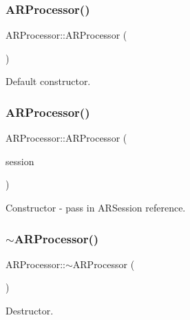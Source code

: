 \subsubsection{\texorpdfstring{A\+R\+Processor()}{ARProcessor()}\hspace{0.1cm}{\footnotesize\ttfamily [1/2]}}
{\footnotesize\ttfamily A\+R\+Processor\+::\+A\+R\+Processor (\begin{DoxyParamCaption}{ }\end{DoxyParamCaption})}



Default constructor. 

\mbox{\label{class_a_r_processor_a2dda14173a82870379c111d13a0562d6}} 
\subsubsection{\texorpdfstring{A\+R\+Processor()}{ARProcessor()}\hspace{0.1cm}{\footnotesize\ttfamily [2/2]}}
{\footnotesize\ttfamily A\+R\+Processor\+::\+A\+R\+Processor (\begin{DoxyParamCaption}\item[{A\+R\+Session $\ast$}]{session }\end{DoxyParamCaption})}



Constructor -\/ pass in A\+R\+Session reference. 

\mbox{\label{class_a_r_processor_a9bd83aa6f017e308d1e55e709621ae84}} 
\subsubsection{\texorpdfstring{$\sim$\+A\+R\+Processor()}{~ARProcessor()}}
{\footnotesize\ttfamily A\+R\+Processor\+::$\sim$\+A\+R\+Processor (\begin{DoxyParamCaption}{ }\end{DoxyParamCaption})}



Destructor. 



